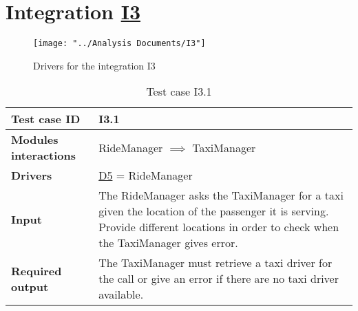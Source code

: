 \section{Integration \hyperref[I3]{I3} \label{int_I3}}
\begin{figure}[H]
\centering
\texttt{[image: "../Analysis Documents/I3"]}
\caption{Drivers for the integration I3}
\end{figure}


\begin{table}[H]
\begin{tabular}{ l | p{} }
\textbf{Test case ID} & I3.1 \\ \hline
\textbf{Modules interactions} & RideManager $\implies$ TaxiManager \\ \hline
\textbf{Drivers} &  \hyperref[D5]{D5} = RideManager \\ \hline
\textbf{Input} & The RideManager asks the TaxiManager for a taxi given the location of the passenger it is serving. Provide different locations in order to check when the TaxiManager gives error. \\ \hline
\textbf{Required output} & The TaxiManager must retrieve a taxi driver for the call or give an error if there are no taxi driver available.
\end{tabular}
\caption{Test case I3.1}
\end{table}